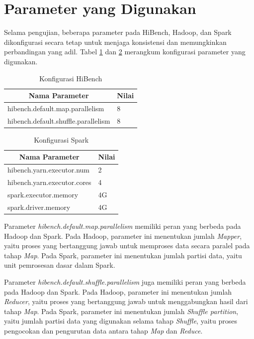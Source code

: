 \section{Parameter yang Digunakan}
Selama pengujian, beberapa parameter pada HiBench, Hadoop, dan Spark dikonfigurasi secara tetap untuk menjaga konsistensi dan memungkinkan perbandingan yang adil. Tabel \ref{table:conf-hibench} dan \ref{table:conf-spark} merangkum konfigurasi parameter yang digunakan.

\begin{table}[h]
\caption{Konfigurasi HiBench}
\label{table:conf-hibench}
\centering
\begin{tabular}{ll}
\hline
\multicolumn{1}{c}{\textbf{Nama Parameter}}  & \multicolumn{1}{c}{\textbf{Nilai}} \\ \hline
hibench.default.map.parallelism     & 8                         \\
hibench.default.shuffle.parallelism & 8 \\ \hline                        
\end{tabular}
\end{table}

\begin{table}[h]
\caption{Konfigurasi Spark}
\label{table:conf-spark}
\centering
\begin{tabular}{ll}
\hline
\multicolumn{1}{c}{\textbf{Nama Parameter}}  & \multicolumn{1}{c}{\textbf{Nilai}} \\ \hline
hibench.yarn.executor.num     & 2                         \\
hibench.yarn.executor.cores & 4 \\ 
spark.executor.memory   & 4G \\
spark.driver.memory & 4G \\ \hline                        
\end{tabular}
\end{table}

\newpage
Parameter \textit{hibench.default.map.parallelism} memiliki peran yang berbeda pada Hadoop dan Spark. Pada Hadoop, parameter ini menentukan jumlah \textit{Mapper}, yaitu proses yang bertanggung jawab untuk memproses data secara paralel pada tahap \textit{Map}. Pada Spark, parameter ini menentukan jumlah partisi data, yaitu unit pemrosesan dasar dalam Spark.

Parameter \textit{hibench.default.shuffle.parallelism} juga memiliki peran yang berbeda pada Hadoop dan Spark. Pada Hadoop, parameter ini menentukan jumlah \textit{Reducer}, yaitu proses yang bertanggung jawab untuk menggabungkan hasil dari tahap \textit{Map}. Pada Spark, parameter ini menentukan jumlah \textit{Shuffle partition}, yaitu jumlah partisi data yang digunakan selama tahap \textit{Shuffle}, yaitu proses pengocokan dan pengurutan data antara tahap \textit{Map} dan \textit{Reduce}.

